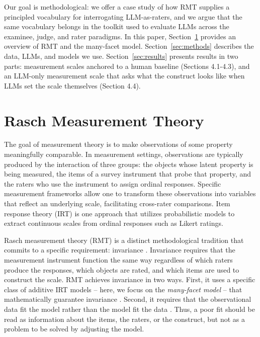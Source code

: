 \documentclass[11pt]{article}
\begin{document}
Our goal is methodological: we offer a case study of how RMT supplies a principled vocabulary for interrogating LLM-as-raters, and we argue that the same vocabulary belongs in the toolkit used to evaluate LLMs across the examinee, judge, and rater paradigms. In this paper, Section~\ref{sec:rmt} provides an overview of RMT and the many-facet model. Section~\ref{sec:methods} describes the data, LLMs, and models we use. Section~\ref{sec:results} presents results in two parts: measurement scales anchored to a human baseline (Sections 4.1-4.3), and an LLM-only measurement scale that asks what the construct looks like when LLMs set the scale themselves (Section 4.4).

\section{Rasch Measurement Theory}
\label{sec:rmt}
The goal of measurement theory is to make observations of some property meaningfully comparable. In measurement settings, observations are typically produced by the interaction of three groups: the objects whose latent property is being measured, the items of a survey instrument that probe that property, and the raters who use the instrument to assign ordinal responses. Specific measurement frameworks allow one to transform these observations into variables that reflect an underlying scale, facilitating cross-rater comparisons. Item response theory (IRT) is one approach that utilizes probabilistic models to extract continuous scales from ordinal responses such as Likert ratings. 

Rasch measurement theory (RMT) is a distinct methodological tradition that commits to a specific requirement: invariance \cite{rasch1993probabilistic, andrich1988rasch}. Invariance requires that the measurement instrument function the same way regardless of which raters produce the responses, which objects are rated, and which items are used to construct the scale. RMT achieves invariance in two ways. First, it uses a specific class of additive IRT models -- here, we focus on the \textit{many-facet model} -- that mathematically guarantee invariance \cite{linacre1989manyfacet}. Second, it requires that the observational data fit the model rather than the model fit the data \cite{bond2015applying}. Thus, a poor fit should be read as information about the items, the raters, or the construct, but not as a problem to be solved by adjusting the model.
\end{document}
